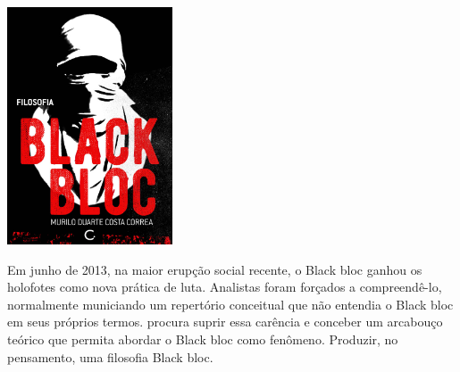 \begin{center}
\hspace*{-.5cm}\includegraphics[width=49mm]{./imgs/blackbloc.jpg}
\end{center}

\hspace*{-7cm}\hrulefill\hspace*{-7cm}

\medskip

\noindent{}Em junho de 2013, na maior erupção social recente, o Black bloc ganhou os holofotes como nova prática de luta. Analistas foram forçados a compreendê-lo, normalmente municiando um repertório conceitual que não entendia o Black bloc em seus próprios termos. {} procura suprir essa carência e conceber um arcabouço teórico que permita abordar o Black bloc como fenômeno. Produzir, no pensamento, uma filosofia Black bloc.

\vfill

\hspace*{-.4cm}\begin{minipage}[c]{1\linewidth}
\small{
{}}
\end{minipage}

\pagebreak

\hspace{.5cm}

